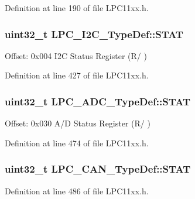 Definition at line 190 of file L\+P\+C11xx.\+h.

\subsubsection[{\texorpdfstring{S\+T\+AT}{STAT}}]{ uint32\+\_\+t L\+P\+C\+\_\+\+I2\+C\+\_\+\+Type\+Def\+::\+S\+T\+AT}\hypertarget{group___l_p_c11xx___definitions_gad899053f412fa24b201a479017f04f5e}{}\label{group___l_p_c11xx___definitions_gad899053f412fa24b201a479017f04f5e}
Offset\+: 0x004 I2C Status Register (R/ ) 

Definition at line 427 of file L\+P\+C11xx.\+h.

\subsubsection[{\texorpdfstring{S\+T\+AT}{STAT}}]{ uint32\+\_\+t L\+P\+C\+\_\+\+A\+D\+C\+\_\+\+Type\+Def\+::\+S\+T\+AT}\hypertarget{group___l_p_c11xx___definitions_ga1bdbd1fea2c9424fa59b47192fcf63d0}{}\label{group___l_p_c11xx___definitions_ga1bdbd1fea2c9424fa59b47192fcf63d0}
Offset\+: 0x030 A/D Status Register (R/ ) 

Definition at line 474 of file L\+P\+C11xx.\+h.

\subsubsection[{\texorpdfstring{S\+T\+AT}{STAT}}]{ uint32\+\_\+t L\+P\+C\+\_\+\+C\+A\+N\+\_\+\+Type\+Def\+::\+S\+T\+AT}\hypertarget{group___l_p_c11xx___definitions_ga0b209f4b82c9f56bbd7b3bbd74ea0c71}{}\label{group___l_p_c11xx___definitions_ga0b209f4b82c9f56bbd7b3bbd74ea0c71}


Definition at line 486 of file L\+P\+C11xx.\+h.

